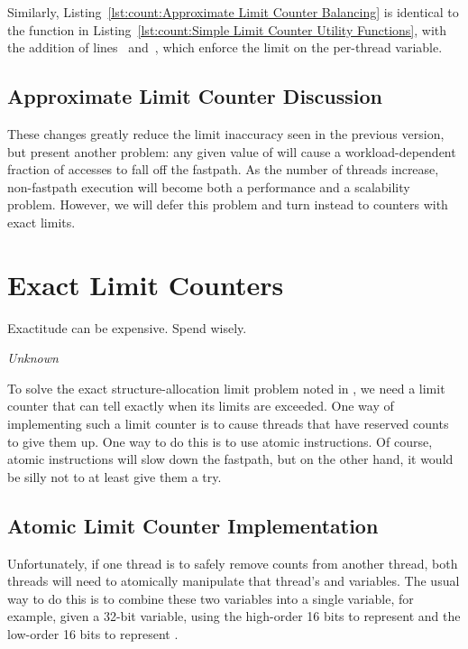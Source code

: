 \begin{lineref}
Similarly,
Listing~\ref{lst:count:Approximate Limit Counter Balancing}
is identical to the  function in
Listing~\ref{lst:count:Simple Limit Counter Utility Functions},
with the addition of
lines~ and~, which enforce the
 limit on the per-thread  variable.
\end{lineref}

\subsection{Approximate Limit Counter Discussion}

These changes greatly reduce the limit inaccuracy seen in the previous version,
but present another problem: any given value of 
will cause a workload-dependent fraction of accesses to fall off the
fastpath.
As the number of threads increase, non-fastpath execution will become both
a performance and a scalability problem.
However, we will defer this problem and turn instead to counters
with exact limits.

\section{Exact Limit Counters}
\label{sec:count:Exact Limit Counters}
%
\epigraph{Exactitude can be expensive.  Spend wisely.}{\emph{Unknown}}

To solve the exact structure-allocation limit problem noted in
\QuickQuizRef{\QcountQexactcnt},
we need a limit counter that can tell exactly when its limits are
exceeded.
One way of implementing such a limit counter is to
cause threads that have reserved counts to give them up.
One way to do this is to use atomic instructions.
Of course, atomic instructions will slow down the fastpath, but on the
other hand, it would be silly not to at least give them a try.

\subsection{Atomic Limit Counter Implementation}
\label{sec:count:Atomic Limit Counter Implementation}

Unfortunately,
if one thread is to safely remove counts from another thread,
both threads will need to atomically manipulate that thread's
 and  variables.
The usual way to do this is to combine these two variables into a
single variable,
for example, given a 32-bit variable, using the high-order 16 bits to
represent  and the low-order 16 bits to represent
.

